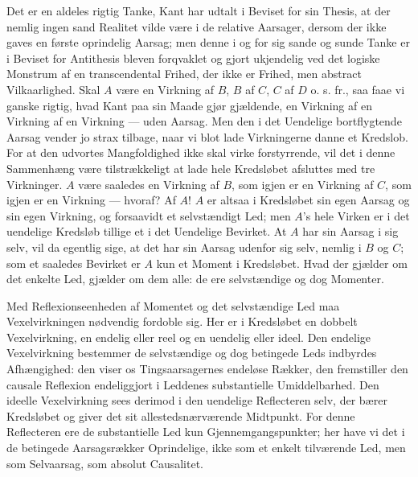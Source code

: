 \documentclass[11pt]{book}
\newcommand{\opage}[1]{\marginnote{\footnotesize\textit{[#1]}}}
\begin{document}
Det er en aldeles rigtig Tanke, Kant har udtalt i Beviset for sin Thesis,
at der nemlig ingen sand Realitet vilde være i de relative Aarsager,
dersom der ikke gaves en første oprindelig Aarsag; men denne i og for sig
sande og sunde Tanke er i Beviset for Antithesis bleven forqvaklet og
gjort ukjendelig ved det logiske Monstrum af en transcendental Frihed,
der ikke er Frihed, men abstract Vilkaarlighed. Skal $A$ være en Virkning
af $B$, $B$ af $C$, $C$ af $D$ o. s. fr., saa faae vi ganske rigtig, hvad
Kant paa sin Maade gjør gjældende, en Virkning af en Virkning af en
Virkning --- uden Aarsag. Men den i det Uendelige bortflygtende Aarsag
vender jo strax tilbage, naar vi blot lade Virkningerne danne et
Kredslob.
\opage{122} \setcounter{footnote}{0}%
For at den udvortes Mangfoldighed ikke skal virke forstyrrende, vil det i
denne Sammenhæng være tilstrækkeligt at lade hele Kredsløbet afsluttes
med tre Virkninger. $A$ være saaledes en Virkning af $B$, som igjen er en
Virkning af $C$, som igjen er en Virkning --- hvoraf? Af $A$! $A$ er
altsaa i Kredsløbet sin egen Aarsag og sin egen Virkning, og forsaavidt
et selvstændigt Led; men $A$'s hele Virken er i det uendelige Kredsløb
tillige et i det Uendelige Bevirket. At $A$ har sin Aarsag i sig selv,
vil da egentlig sige, at det har sin Aarsag udenfor sig selv, nemlig i
$B$ og $C$; som et saaledes Bevirket er $A$ kun et Moment i Kredsløbet.
Hvad der gjælder om det enkelte Led, gjælder om dem alle: de ere
selvstændige og dog Momenter.

Med Reflexionseenheden af Momentet og det selvstændige Led maa
Vexelvirkningen nødvendig fordoble sig. Her er i Kredsløbet en dobbelt
Vexelvirkning, en endelig eller reel og en uendelig eller ideel. Den
endelige Vexelvirkning bestemmer de selvstændige og dog betingede Leds
indbyrdes Afhængighed: den viser os Tingsaarsagernes endeløse Rækker, den
fremstiller den causale Reflexion endeliggjort i Leddenes substantielle
Umiddelbarhed. Den ideelle Vexelvirkning sees derimod i den uendelige
Reflecteren selv, der bærer Kredsløbet og giver det sit
allestedsnærværende Midtpunkt. For denne Reflecteren ere de substantielle
Led kun Gjennemgangspunkter; her have vi det i de betingede
Aarsagsrækker Oprindelige, ikke som et enkelt tilværende Led, men som
Selvaarsag, som absolut Causalitet.
\end{document}
